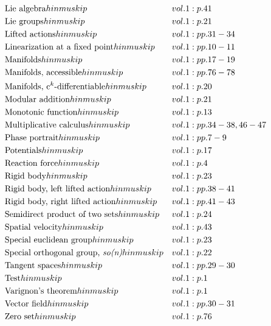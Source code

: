 \documentclass[a4paper]{article}
\begin{document}
\begin{align*}
&\text{Lie algebra} 	hinmuskip&& vol. 1: p. 41\\
&\text{Lie groups} 	hinmuskip&& vol. 1: p. 21\\
&\text{Lifted actions} 	hinmuskip&& vol. 1: pp. 31-34\\
&\text{Linearization at a fixed point} 	hinmuskip&& vol. 1: pp. 10-11\\
&\text{Manifolds} 	hinmuskip&& vol. 1: pp. 17-19\\
&\text{Manifolds, accessible} 	hinmuskip&& vol. 1: pp. 76-78\\
&\text{Manifolds, c$^k$-differentiable} 	hinmuskip&& vol. 1: p. 20\\
&\text{Modular addition} 	hinmuskip&& vol. 1: p. 21\\
&\text{Monotonic function} 	hinmuskip&& vol. 1: p. 13\\
&\text{Multiplicative calculus} 	hinmuskip&& vol. 1: pp. 34-38, 46-47\\
&\text{Phase portrait} 	hinmuskip&& vol. 1: pp. 7-9\\
&\text{Potentials} 	hinmuskip&& vol. 1: p. 17\\
&\text{Reaction force} 	hinmuskip&& vol. 1: p. 4\\
&\text{Rigid body} 	hinmuskip&& vol. 1: p. 23\\
&\text{Rigid body, left lifted action} 	hinmuskip&& vol. 1: pp. 38-41\\
&\text{Rigid body, right lifted action} 	hinmuskip&& vol. 1: pp. 41-43\\
&\text{Semidirect product of two sets} 	hinmuskip&& vol. 1: p. 24\\
&\text{Spatial velocity} 	hinmuskip&& vol. 1: p. 43\\
&\text{Special euclidean group} 	hinmuskip&& vol. 1: p. 23\\
&\text{Special orthogonal group, \emph{so(n)}} 	hinmuskip&& vol. 1: p. 22\\
&\text{Tangent spaces} 	hinmuskip&& vol. 1: pp. 29-30\\
&\text{Test} 	hinmuskip&& vol. 1: p. 1\\
&\text{Varignon's theorem} 	hinmuskip&& vol. 1: p. 1\\
&\text{Vector field} 	hinmuskip&& vol. 1: pp. 30-31\\
&\text{Zero set} 	hinmuskip&& vol. 1: p. 76\\
\end{align*} 
\end{document}
